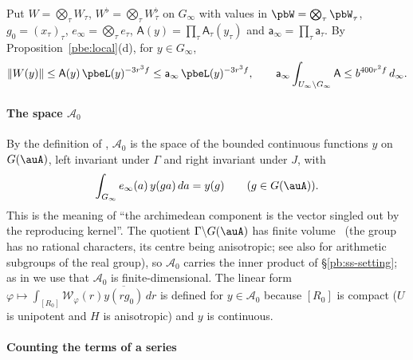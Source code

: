 \documentclass[10pt]{amsart}
\theoremstyle{definition}
\theoremstyle{remark}
\providecommand{\auAz}{\mathcal A_0}
\providecommand{\aubar}[1]{\overline{#1}}
\begin{document}
Put $W=\bigotimes_\tau W_\tau$, $W^\flat=\bigotimes_\tau W_\tau^\flat$ on $G_\infty$ with values in
$\pbW=\bigotimes_\tau\pbW_\tau$, $g_0=(x_\tau)_\tau$, $e_\infty=\bigotimes_\tau e_\tau$, $\mathsf
A(y)=\prod_\tau\mathsf A_\tau(y_\tau)$ and $\mathsf a_\infty=\prod_\tau\mathsf a_\tau$. By
Proposition~\ref{pbe:local}(d), for $y\in G_\infty$,
\begin{equation}\label{pbe:eq-decay}
\|W(y)\|\le\mathsf A(y)\,\pbeL(y)^{-3r^3f}\le\mathsf a_\infty\,\pbeL(y)^{-3r^3f},\qquad\mathsf a_\infty
\int_{U_\infty\backslash G_\infty}\mathsf A\le b^{400r^2f}\,d_\infty .
\end{equation}

\paragraph*{The space $\auAz$}
By the definition of {\cite[\S14.3]{P46}}, $\auAz$ is the space of the bounded continuous functions $y$ on $G(\auA)$, left invariant under
$\Gamma$ and right invariant under $J$, with
\begin{equation}\label{pbe:eq-repro}
\int_{G_\infty}e_\infty(a)\,y(ga)\,da=y(g)\qquad(g\in G(\auA)).
\end{equation}
This is the meaning of ``the archimedean component is the vector singled out by the reproducing
kernel''. The quotient $\Gamma\backslash G(\auA)$ has finite volume~\cite[Theorem~5.6(i)]{BorelFin} (the group has no rational characters, its centre being anisotropic; see also \cite[Theorem~9.4]{BorelHC1962} for arithmetic subgroups of the real group), so $\auAz$
carries the inner product of \S\ref{pb:ss-setting}; as in {\cite[\S14.3]{P46}} we use that $\auAz$
is finite-dimensional. The linear form $\varphi\mapsto\int_{[R_0]}\mathcal W_\varphi(r)\aubar{y(rg_0)}
\,dr$ is defined for $y\in\auAz$ because $[R_0]$ is compact ($U$ is unipotent and $H$ is
anisotropic) and $y$ is continuous.

\paragraph*{Counting the terms of a series}
\end{document}
